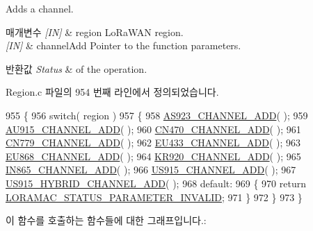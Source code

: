 Adds a channel. 


\begin{DoxyParams}{매개변수}
{\em \mbox{[}\+I\+N\mbox{]}} & region Lo\+Ra\+W\+AN region.\\
\hline
{\em \mbox{[}\+I\+N\mbox{]}} & channel\+Add Pointer to the function parameters.\\
\hline
\end{DoxyParams}

\begin{DoxyRetVals}{반환값}
{\em Status} & of the operation. \\
\hline
\end{DoxyRetVals}


Region.\+c 파일의 954 번째 라인에서 정의되었습니다.


\begin{DoxyCode}
955 \{
956     \textcolor{keywordflow}{switch}( region )
957     \{
958         \mbox{\hyperlink{_region_8c_a5d5eaa86f0eb43b289f6a04be195dc8f}{AS923\_CHANNEL\_ADD}}( );
959         \mbox{\hyperlink{_region_8c_a0ba2b8453d60054388d0d55341e58079}{AU915\_CHANNEL\_ADD}}( );
960         \mbox{\hyperlink{_region_8c_a96d482c3b50ce6c743f30529a6a232ad}{CN470\_CHANNEL\_ADD}}( );
961         \mbox{\hyperlink{_region_8c_a80f9cc9bcab66e181639a3fc481de236}{CN779\_CHANNEL\_ADD}}( );
962         \mbox{\hyperlink{_region_8c_aa62815760fdcc436cc00dfa8d84a15bd}{EU433\_CHANNEL\_ADD}}( );
963         \mbox{\hyperlink{_region_8c_af2ed62cb2303216857b49588cc46c475}{EU868\_CHANNEL\_ADD}}( );
964         \mbox{\hyperlink{_region_8c_ab7434e6fcc2c85b90683c16943f3000e}{KR920\_CHANNEL\_ADD}}( );
965         \mbox{\hyperlink{_region_8c_addf2e20e43a738b7ca5fb9232c75088c}{IN865\_CHANNEL\_ADD}}( );
966         \mbox{\hyperlink{_region_8c_aa58471f710e2847f47062cc8659bb929}{US915\_CHANNEL\_ADD}}( );
967         \mbox{\hyperlink{_region_8c_a3ab6a639ac6d0029010a1e071acfff58}{US915\_HYBRID\_CHANNEL\_ADD}}( );
968         \textcolor{keywordflow}{default}:
969         \{
970             \textcolor{keywordflow}{return} \mbox{\hyperlink{group___l_o_r_a_m_a_c_gga1d18f26b344040b3ec5c3db662919661ad0d3119f247d00e1787dda106fcb3017}{LORAMAC\_STATUS\_PARAMETER\_INVALID}};
971         \}
972     \}
973 \}
\end{DoxyCode}
이 함수를 호출하는 함수들에 대한 그래프입니다.\+:
\mbox{\label{group___r_e_g_i_o_n_ga50b3505e13d8373fef6e2be6d48e150c}} 
